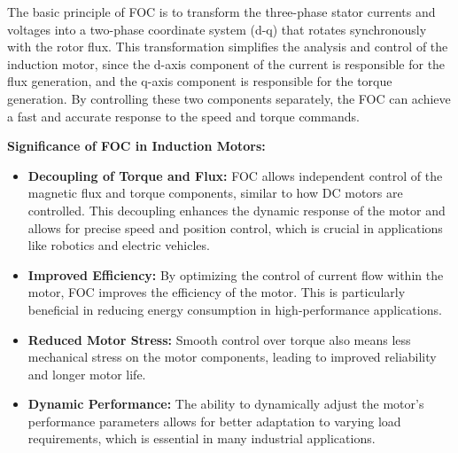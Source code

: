 The basic principle of FOC is to transform the three-phase stator currents and voltages into a two-phase coordinate system (d-q) that rotates synchronously with the rotor flux. This transformation simplifies the analysis and control of the induction motor, since the d-axis component of the current is responsible for the flux generation, and the q-axis component is responsible for the torque generation. By controlling these two components separately, the FOC can achieve a fast and accurate response to the speed and torque commands.

\textbf{Significance of FOC in Induction Motors:}
\begin{itemize}
    \item \textbf{Decoupling of Torque and Flux:} FOC allows independent control of the magnetic flux and torque components, similar to how DC motors are controlled. This decoupling enhances the dynamic response of the motor and allows for precise speed and position control, which is crucial in applications like robotics and electric vehicles.
    \item \textbf{Improved Efficiency:} By optimizing the control of current flow within the motor, FOC improves the efficiency of the motor. This is particularly beneficial in reducing energy consumption in high-performance applications.
    \item \textbf{Reduced Motor Stress:} Smooth control over torque also means less mechanical stress on the motor components, leading to improved reliability and longer motor life.
    \item \textbf{Dynamic Performance:} The ability to dynamically adjust the motor's performance parameters allows for better adaptation to varying load requirements, which is essential in many industrial applications.
\end{itemize}

